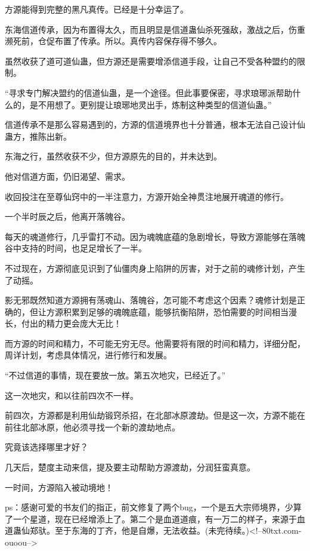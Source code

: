 \begin{this_body}
方源能得到完整的黑凡真传。已经是十分幸运了。

东海信道传承，因为布置得太久，而且明显是信道蛊仙杀死强敌，激战之后，伤重濒死前，仓促布置了传承。所以。真传内容保存得不够久。

虽然收获了道可道仙蛊，但方源还是需要增添信道手段，让自己不受各种盟约的限制。

“寻求专门解决盟约的信道仙蛊，是一个途径。但此事要保密，寻求琅琊派帮助什么的，是不用想了。更别提让琅琊地灵出手，炼制这种类型的信道仙蛊。”

信道传承不是那么容易遇到的，方源的信道境界也十分普通，根本无法自己设计仙蛊方，推陈出新。

东海之行，虽然收获不少，但方源原先的目的，并未达到。

他对信道方面，仍旧渴望、需求。

收回投注在至尊仙窍中的一半注意力，方源开始全神贯注地展开魂道的修行。

一个半时辰之后，他离开落魄谷。

每天的魂道修行，几乎雷打不动。因为魂魄底蕴的急剧增长，导致方源能够在落魄谷中支持的时间，也足足增长了一半。

不过现在，方源彻底见识到了仙僵肉身上陷阱的厉害，对于之前的魂修计划，产生了动摇。

影无邪既然知道方源拥有荡魂山、落魄谷，怎可能不考虑这个因素？魂修计划是正确的，但让方源积累到足够的魂魄底蕴，能够抗衡陷阱，恐怕需要的时间相当漫长，付出的精力更会庞大无比！

而方源的时间和精力，不可能无穷无尽。他需要将有限的时间和精力，详细分配，周详计划，考虑具体情况，进行修行和发展。

“不过信道的事情，现在要放一放。第五次地灾，已经近了。”

这一次地灾，和以往前四次不一样。

前四次，方源都是利用仙劫锻窍杀招，在北部冰原渡劫。但是这一次，方源不能在前往北部冰原，他必须寻找一个新的渡劫地点。

究竟该选择哪里才好？

几天后，楚度主动来信，提及要主动帮助方源渡劫，分润狂蛮真意。

一时间，方源陷入被动境地！

ps：感谢可爱的书友们的指正，前文修复了两个bug，一个是五大宗师境界，少算了一个星道，现在已经增添上了。第二个是血道道痕，有一万二的样子，来源于血道蛊仙郑驮。至于东海的丁齐，他是自爆，无法收益。(未完待续。)<!--80txt.com-ouoou-->

\end{this_body}

